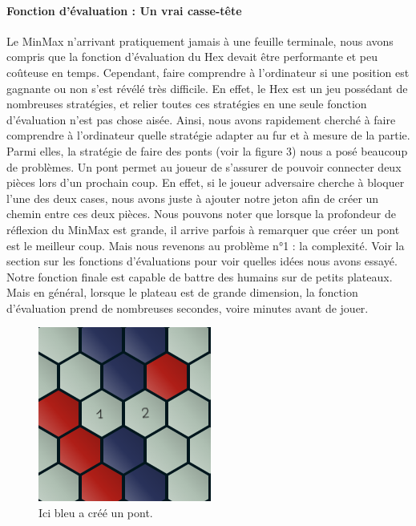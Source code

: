 \paragraph{Fonction d'évaluation : Un vrai casse-tête}
Le MinMax n'arrivant pratiquement jamais à une feuille terminale, nous avons compris que la fonction
d'évaluation du Hex devait être performante et peu coûteuse en temps. Cependant, faire comprendre à l'ordinateur si une position est gagnante
ou non s'est révélé très difficile. En effet, le Hex est un jeu possédant de nombreuses stratégies, et relier toutes ces stratégies en une
seule fonction d'évaluation n'est pas chose aisée. Ainsi, nous avons rapidement cherché à faire comprendre à l'ordinateur
quelle stratégie adapter au fur et à mesure de la partie. Parmi elles, la stratégie de faire des ponts (voir la figure 3) nous a posé beaucoup de problèmes.
Un pont permet au joueur de s'assurer de pouvoir connecter deux pièces lors d'un prochain coup. En effet, si le joueur adversaire cherche à bloquer
l'une des deux cases, nous avons juste à ajouter notre jeton afin de créer un chemin entre ces deux pièces. Nous pouvons noter que lorsque la profondeur de
réflexion du MinMax est grande, il arrive parfois à remarquer que créer un pont est le meilleur coup. Mais nous revenons au problème n°1 : la complexité.
Voir la section sur les fonctions d'évaluations pour voir quelles idées nous avons essayé. Notre fonction finale est capable de battre des humains sur de petits 
plateaux. Mais en général, lorsque le plateau est de grande dimension, la fonction d'évaluation prend de nombreuses secondes, voire minutes avant de jouer.

\begin{figure}[h]
    \begin{center}
        \includegraphics[scale=0.5]{root/pont.png}
    \end{center}
    \caption[1]{Ici bleu a créé un pont\footnotemark.}\label{fig:pont_bleu}
\end{figure}

